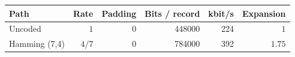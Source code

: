 \begin{tabular}{lrrrrr}
\toprule
Path & Rate & Padding & Bits / record & kbit/s & Expansion \\
\midrule
Uncoded & $1$ & 0 & 448000 & 224 & $1$ \\
Hamming (7,4) & $4/7$ & 0 & 784000 & 392 & $1.75$ \\
\bottomrule
\end{tabular}
